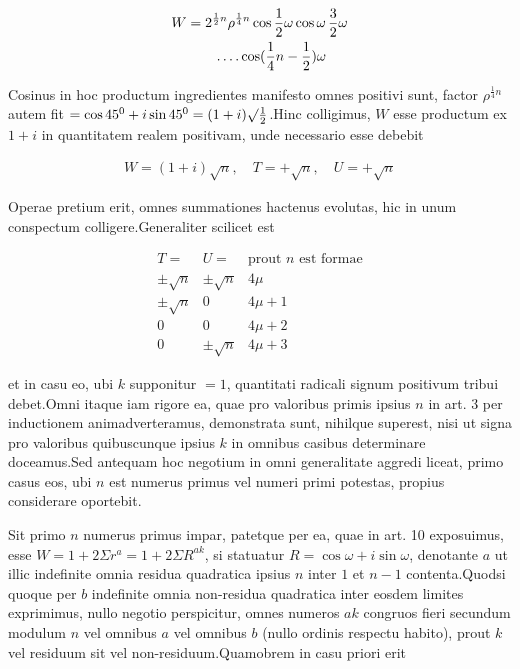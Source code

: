 %
\[
\begin{aligned}
W&=2^{\frac12n}\rho^{\frac14n}\cos\frac12\omega\cos\omega\,\frac32\omega\\&\qquad\mathinner{.\,.\,.\,.}\cos(\frac14n-\frac12)\omega
\end{aligned}
\]

Cosinus in hoc productum ingredientes manifesto omnes positivi sunt, factor $\rho^{\frac14n}$ autem fit $=\cos45^0+i\sin45^0=(1+i)\surd\frac12$.\quad Hinc colligimus, $W$ esse productum ex $1+i$ in quantitatem realem positivam, unde necessario esse debebit

\[
\begin{aligned}
W=(1+i)\surd n,\quad T=+\surd n,\quad U=+\surd n
\end{aligned}
\]


Operae pretium erit, omnes summationes hactenus evolutas, hic in unum conspectum colligere.\quad Generaliter scilicet est

\[
\begin{array}{c|c|c}
T=&U=&\text{prout }n\text{ est formae}\\\hline
\pm\surd n&\pm\surd n&4\mu\\
\pm\surd n&0&4\mu+1\\
0&0&4\mu+2\\
0&\pm\surd n&4\mu+3
\end{array}
\]

et in casu eo, ubi $k$ supponitur $=1$, quantitati radicali signum positivum tribui debet.\quad Omni itaque iam rigore ea, quae pro valoribus primis ipsius $n$ in art. 3 per inductionem animadverteramus, demonstrata sunt, nihilque superest, nisi ut signa pro valoribus quibuscunque ipsius $k$ in omnibus casibus determinare doceamus.\quad Sed antequam hoc negotium in omni generalitate aggredi liceat, primo casus eos, ubi $n$ est numerus primus vel numeri primi potestas, propius considerare oportebit.


Sit primo $n$ numerus primus impar, patetque per ea, quae in art. 10 exposuimus, esse $W=1+2\Sigma r^a=1+2\Sigma R^{ak}$, si statuatur $R=\cos\omega+i\sin\omega$, denotante $a$ ut illic indefinite omnia residua quadratica ipsius $n$ inter $1$ et $n-1$ contenta.\quad Quodsi quoque per $b$ indefinite omnia non-residua quadratica inter eosdem limites exprimimus, nullo negotio perspicitur, omnes numeros $ak$ congruos fieri secundum modulum $n$ vel omnibus $a$ vel omnibus $b$ (nullo ordinis respectu habito), prout $k$ vel residuum sit vel non-residuum.\quad Quamobrem in casu priori erit

